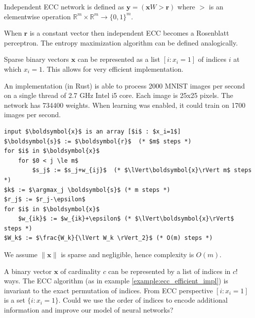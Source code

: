 \documentclass[oneside,english,logo]{amuthesis}
\DeclareMathOperator*{\argmax}{argmax}
\begin{document}
\begin{definition}
Independent ECC network is defined as $\boldsymbol{y} = (\boldsymbol{x}W > \boldsymbol{r})$ where $>$ is an elementwise operation $\mathbb{R}^m \times \mathbb{R}^m \rightarrow \{0,1\}^m$.
\end{definition}
When $\boldsymbol{r}$ is a constant vector then independent ECC becomes a Rosenblatt perceptron.
The entropy maximization algorithm can be defined analogically. 
\fi

Sparse binary vectors $\boldsymbol{x}$ can be represented as a list $[i:x_i=1]$ of indices $i$ at which $x_i=1$. This allows for very efficient implementation.
\begin{example} \label{example:ecc_efficient_impl}
An implementation (in Rust) is able to process 2000 MNIST images per second on a single thread of 2.7 GHz Intel i5 core. Each image is 25x25 pixels. The network has 734400 weights. When learning was enabled, it could train on 1700 images per second. 
\begin{lstlisting}
input $\boldsymbol{x}$ is an array [$i$ : $x_i=1$]
$\boldsymbol{s}$ := $\boldsymbol{r}$  (* $m$ steps *)
for $i$ in $\boldsymbol{x}$   
    for $0 < j \le m$ 
        $s_j$ := $s_j+w_{ij}$  (* $\lVert\boldsymbol{x}\rVert m$ steps *)
$k$ := $\argmax_j \boldsymbol{s}$ (* m steps *)
$r_j$ := $r_j-\epsilon$
for $i$ in $\boldsymbol{x}$ 
    $w_{ik}$ := $w_{ik}+\epsilon$ (* $\lVert\boldsymbol{x}\rVert$ steps *)
$W_k$ := $\frac{W_k}{\lVert W_k \rVert_2}$ (* O(m) steps *)
\end{lstlisting}
We assume $\lVert \boldsymbol{x}\rVert$ is sparse and negligible, hence complexity is $O(m)$. 

\end{example}

A binary vector $\boldsymbol{x}$ of cardinality $c$ can be represented by a list of indices in $c!$ ways.
The ECC algorithm (as in example \ref{example:ecc_efficient_impl}) is invariant to the exact permutation of indices.
From ECC perspective $[i : x_i=1]$ is a set $\{i : x_i=1\}$. Could we use the order of indices to encode additional information and improve our model of neural networks?
\end{document}
